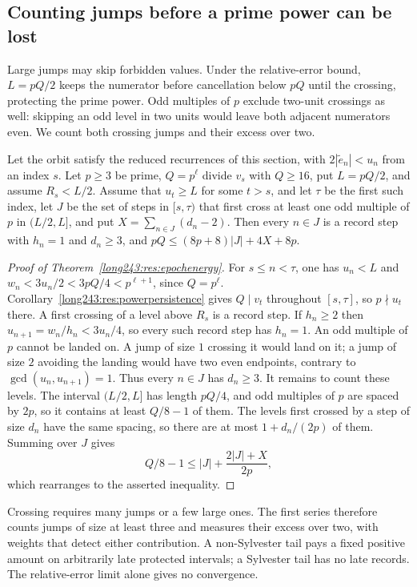 \subsection{Counting jumps before a prime power can be lost}

Large jumps may skip forbidden values. Under the relative-error
bound, $L=pQ/2$ keeps the numerator before cancellation below $pQ$
until the crossing, protecting the prime power. Odd multiples of $p$
exclude two-unit crossings as well: skipping an odd level in two
units would leave both adjacent numerators even. We count both
crossing jumps and their excess over two.

\begin{theorem}\label{long243:res:epochenergy}
Let the orbit satisfy the reduced recurrences of this section, with
$2|\tilde e_n|<u_n$ from an
index $s$.  Let $p\ge3$ be prime, $Q=p^{\ell}$ divide $v_s$ with $Q\ge16$, put
$L=pQ/2$, and assume $R_s<L/2$. Assume that $u_t\ge L$ for some $t>s$,
and let $\tau$ be the first such index, let $J$ be the set of steps in $[s,\tau)$ that first cross at least one odd
multiple of $p$ in $(L/2,L]$, and put $X=\sum_{n\in J}(d_n-2)$.  Then every
$n\in J$ is a record step with $h_n=1$ and $d_n\ge3$, and
$pQ\le(8p+8)\lvert J\rvert+4X+8p$.
\end{theorem}

\begin{proof}[Proof of Theorem~\ref{long243:res:epochenergy}]
For $s\le n<\tau$, one has $u_n<L$ and
$w_n<3u_n/2<3pQ/4<p^{\ell+1}$, since $Q=p^{\ell}$.
Corollary~\ref{long243:res:powerpersistence} gives $Q\mid v_t$ throughout
$[s,\tau]$, so $p\nmid u_t$ there. A first crossing of a level above $R_s$
is a record step. If $h_n\ge2$ then $u_{n+1}=w_n/h_n<3u_n/4$, so every
such record step has $h_n=1$.
An odd multiple of $p$ cannot be landed on. A jump of size $1$ crossing it
would land on it; a jump of size $2$ avoiding the landing would have two
even endpoints, contrary to $\gcd(u_n,u_{n+1})=1$. Thus every $n\in J$
has $d_n\ge3$.
It remains to count these levels. The interval $(L/2,L]$ has length
$pQ/4$, and odd multiples of $p$ are spaced by $2p$, so it contains
at least $Q/8-1$ of them. The levels first crossed by a step of size
$d_n$ have the same spacing, so
there are at most $1+d_n/(2p)$ of them. Summing over $J$ gives
\[
 Q/8-1\le |J|+\frac{2|J|+X}{2p},
\]
which rearranges to the asserted inequality.
\end{proof}

Crossing requires many jumps or a few large ones. The first series
therefore counts jumps of size at least three and measures their
excess over two, with weights that detect either contribution.
A non-Sylvester tail pays a fixed positive amount on arbitrarily late
protected intervals; a Sylvester tail has no late records. The
relative-error limit alone gives no convergence.

